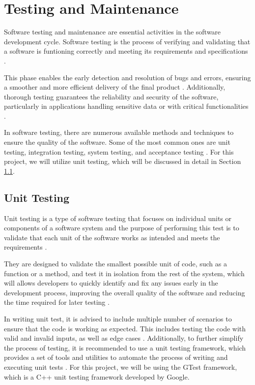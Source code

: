 \chapter{Testing and Maintenance}
\label{chapter:testing_and_maintenance}

Software testing and maintenance are essential activities in the software development cycle. Software testing is the process of verifying and validating that a software is funtioning correctly and meeting its requirements and specifications \cite{ibm} \cite{Hamilton_2023}.

This phase enables the early detection and resolution of bugs and errors, ensuring a smoother and more efficient delivery of the final product \cite{Hamilton_2023}. Additionally, thorough testing guarantees the reliability and security of the software, particularly in applications handling sensitive data or with critical functionalities \cite{Hamilton_2023}.

In software testing, there are numerous available methods and techniques to ensure the quality of the software. Some of the most common ones are unit testing, integration testing, system testing, and acceptance testing \cite{ibm}. For this project, we will utilize unit testing, which will be discussed in detail in Section \ref{section:unit_testing}.

\section{Unit Testing}
\label{section:unit_testing}

Unit testing is a type of software testing that focuses on individual units or components of a software system and the purpose of performing this test is to validate that each unit of the software works as intended and meets the requirements \cite{geeksforgeeks_2023}.

They are designed to validate the smallest possible unit of code, such as a function or a method, and test it in isolation from the rest of the system, which will allows developers to quickly identify and fix any issues early in the development process, improving the overall quality of the software and reducing the time required for later testing \cite{geeksforgeeks_2023}.

In writing unit test, it is advised to include multiple number of scenarios to ensure that the code is working as expected. This includes testing the code with valid and invalid inputs, as well as edge cases \cite{Vartanian_2022}. Additionally, to further simplify the process of testing, it is recommended to use a unit testing framework, which provides a set of tools and utilities to automate the process of writing and executing unit tests \cite{Vartanian_2022}. For this project, we will be using the GTest framework, which is a C++ unit testing framework developed by Google.

